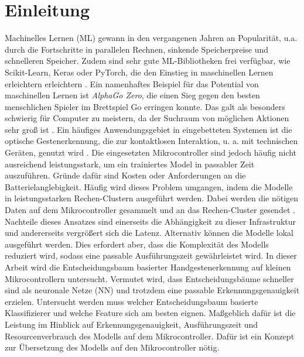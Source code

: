 \chapter{Einleitung}
Machinelles Lernen (ML) gewann in den vergangenen Jahren an Popularität, u.a. durch die Fortschritte in parallelen Rechnen,
sinkende Speicherpreise und schnelleren Speicher. Zudem sind sehr gute ML-Bibliotheken frei verfügbar, wie Scikit-Learn, Keras oder PyTorch, die
den Einstieg in maschinellen Lernen erleichtern erleichtern \cite{abadi2016tensorflow}. Ein namenhaftes Beispiel für das Potential von maschinellen Lernen ist \textit{AlphaGo Zero},
die einen Sieg gegen den besten menschlichen Spieler im Brettspiel Go erringen konnte. Das galt als besonders schwierig für Computer zu meistern,
da der Suchraum von möglichen Aktionen sehr groß ist \cite{silver2017mastering}.
\newline
\newline
Ein häufiges Anwendungsgebiet in eingebetteten Systemen ist die optische Gestenerkennung, die zur kontaktlosen Interaktion, u. a. mit technischen Geräten, genutzt wird \cite{pavlovic1997visual}.
Die eingesetzten Mikrocontroller sind jedoch häufig nicht ausreichend leistungsstark, um ein trainiertes Model in passabler Zeit auszuführen. Gründe dafür sind
Kosten oder Anforderungen an die Batterielanglebigkeit. Häufig wird dieses Problem umgangen, indem die Modelle in leistungsstarken Rechen-Clustern ausgeführt werden.
Dabei werden die nötigen Daten auf dem Mikrocontroller gesammelt und an das Rechen-Cluster gesendet \cite{venzkeArticle}. Nachteile dieses Ansatzes sind einerseits die Abhängigkeit zu dieser
Infrastruktur und andererseits vergrößert sich die Latenz. Alternativ können die Modelle lokal ausgeführt werden. Dies erfordert aber, dass die Komplexität des Modells reduziert wird,
sodass eine passable Ausführungszeit gewährleistet wird.
\newline
\newline
In dieser Arbeit wird die Entscheidungsbaum basierter Handgestenerkennung auf kleinen Mikrocontrollern untersucht. Vermutet wird, dass Entscheidungsbäume schneller sind als neuronale Netze (NN) und
trotzdem eine passable Erkennungsgenauigkeit erzielen. Untersucht werden muss welcher Entscheidungsbaum basierte Klassifizierer und welche Feature sich am besten eignen. Maßgeblich dafür ist die Leistung
im Hinblick auf Erkennungsgenauigkeit, Ausführungszeit und Resourcenverbrauch des Modells auf dem Mikrocontroller. Dafür ist ein Konzept zur Übersetzung des Modells auf den Mikrocontroller nötig.
